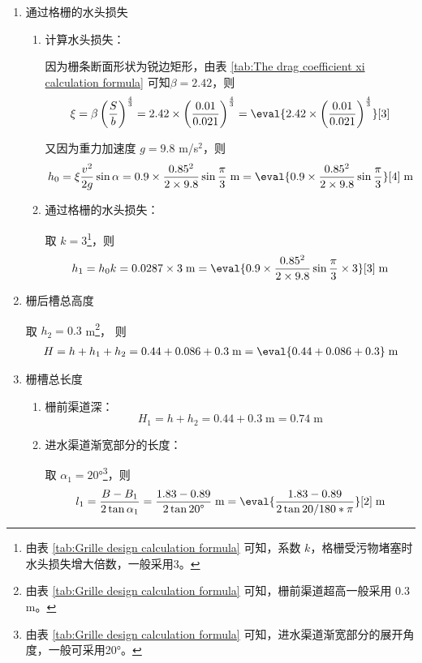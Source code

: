 \begin{enumerate}
	\item 通过格栅的水头损失
	
	\begin{enumerate}
		\item 计算水头损失：

		因为栅条断面形状为锐边矩形，由表 \ref{tab:The drag coefficient xi calculation formula} 可知$\beta=2.42$，则
		\begin{align}
			\xi=\beta\left(\dfrac{S}{b}\right)^{\frac{4}{3}} =2.42\times\left(\dfrac{0.01}{0.021}\right)^{\frac{4}{3}}=\eval{2.42\times\left(\dfrac{0.01}{0.021}\right)^{\frac{4}{3}}}[3] 
		\end{align}

		又因为重力加速度 $g=9.8$ m/s$^2$，则
		\begin{align}
			h_0=\xi\dfrac{v^2}{2g}\sin\alpha=0.9\times\dfrac{0.85^2}{2\times9.8}\sin{\frac{\pi}{3}}\;\text{m}=\eval{0.9\times\dfrac{0.85^2}{2\times9.8}\sin{\frac{\pi}{3}}}[4] \;\text{m}
		\end{align}

		\item 通过格栅的水头损失：

		取 $k=3$\footnote{由表 \ref{tab:Grille design calculation formula} 可知，系数 $k$，格栅受污物堵塞时水头损失增大倍数，一般采用3。}，则
		\begin{align}
			h_1=h_0k=0.0287\times3 \;\text{m}=\eval{0.9\times\dfrac{0.85^2}{2\times9.8}\sin{\frac{\pi}{3}}\times3}[3]\;\text{m}
		\end{align}
	\end{enumerate}
	
	\item 栅后槽总高度
	
	取 $h_2=0.3$ m\footnote{由表 \ref{tab:Grille design calculation formula} 可知，栅前渠道超高一般采用 0.3 m。}，	则
	\begin{align}
		H=h+h_1+h_2=0.44+0.086+0.3\;\text{m}=\eval{0.44+0.086+0.3}\;\text{m}
	\end{align}
	\item 栅槽总长度
	
	\begin{enumerate}
		\item 栅前渠道深：
		\begin{equation}
			H_1=h+h_2=0.44+0.3\;\text{m}=0.74\;\text{m}
		\end{equation}
		\item 进水渠道渐宽部分的长度：
		
		取 $\alpha_1=20$°\footnote{由表 \ref{tab:Grille design calculation formula} 可知，进水渠道渐宽部分的展开角度，一般可采用20°。}，则
		\begin{equation}
			l_1=\dfrac{B-B_1}{2\tan\alpha_1}=\dfrac{1.83-0.89}{2\tan{20}\text{°}}\;\text{m}=\eval{\dfrac{1.83-0.89}{2\tan{20/180*\pi}}}[2]\;\text{m}
		\end{equation}


\end{enumerate}
\end{enumerate}
